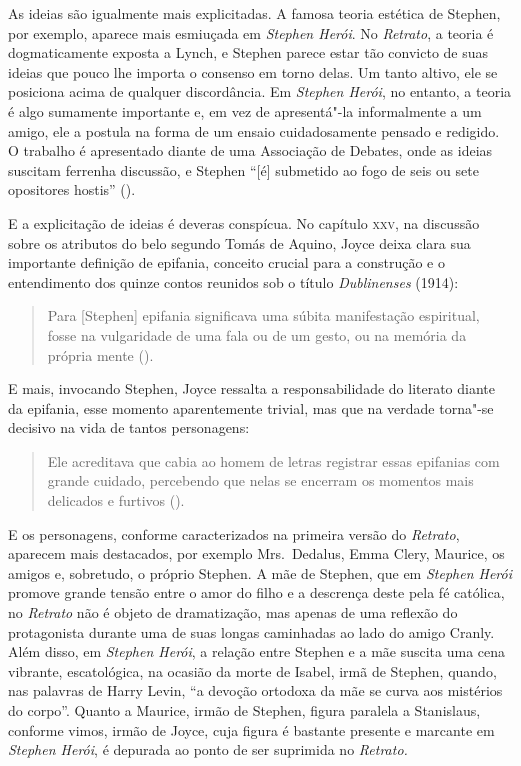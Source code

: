 As ideias são igualmente mais explicitadas.  A famosa teoria
estética de Stephen, por exemplo, aparece mais esmiuçada em
\textit{Stephen Herói}.  No \textit{Retrato}, a teoria é dogmaticamente
exposta a Lynch, e Stephen parece estar tão convicto de suas ideias que
pouco lhe importa o consenso em torno delas.  Um tanto altivo,
ele se posiciona acima de qualquer discordância.  Em \textit{Stephen
Herói}, no entanto, a teoria é algo sumamente importante e, em vez de
apresentá"-la informalmente a um amigo, ele a postula na forma de um
ensaio cuidadosamente pensado e redigido.  O trabalho é apresentado
diante de uma Associação de Debates, onde as ideias suscitam ferrenha
discussão, e Stephen “[é] submetido ao fogo de seis ou sete opositores
hostis” (\pageref{refintro}).

E a explicitação de ideias é deveras conspícua.  No capítulo \textsc{xxv}, na
discussão sobre os atributos do belo segundo Tomás de Aquino, Joyce
deixa clara sua importante definição de epifania, conceito crucial para
a construção e o entendimento dos quinze contos reunidos sob o título
\textit{Dublinenses} (1914): 

\begin{quote}
Para [Stephen] epifania significava uma
súbita manifestação espiritual, fosse na vulgaridade de uma fala ou de
um gesto, ou na memória da própria mente (\pageref{refintro2}). 
\end{quote}
 
E mais, invocando
Stephen, Joyce ressalta a responsabilidade do literato diante da
epifania, esse momento aparentemente trivial, mas que na verdade
torna"-se decisivo na vida de tantos personagens: 

\begin{quote}
Ele acreditava que cabia ao homem de letras registrar essas epifanias com grande cuidado,
percebendo que nelas se encerram os momentos mais delicados e furtivos
(\pageref{refintro3}).
\end{quote}

E os personagens, conforme caracterizados na primeira versão do
\textit{Retrato}, aparecem mais destacados, por exemplo Mrs.~Dedalus,
Emma Clery, Maurice, os amigos e, sobretudo, o próprio Stephen.  A mãe
de Stephen, que em \textit{Stephen Herói} promove grande tensão entre o
amor do filho e a descrença deste pela fé católica, no \textit{Retrato}
não é objeto de dramatização, mas apenas de uma reflexão do
protagonista durante uma de suas longas caminhadas ao lado do amigo
Cranly.  Além disso, em \textit{Stephen Herói}, a relação entre Stephen
e a mãe suscita uma cena vibrante, escatológica, na ocasião da morte de
Isabel, irmã de Stephen, quando, nas palavras de Harry Levin, “a
devoção ortodoxa da mãe se curva aos mistérios do corpo”.  Quanto		
a Maurice, irmão de Stephen, figura paralela a Stanislaus, conforme
vimos, irmão de Joyce, cuja figura é bastante presente e marcante em
\textit{Stephen Herói}, é depurada ao ponto de ser suprimida no
\textit{Retrato.} 

